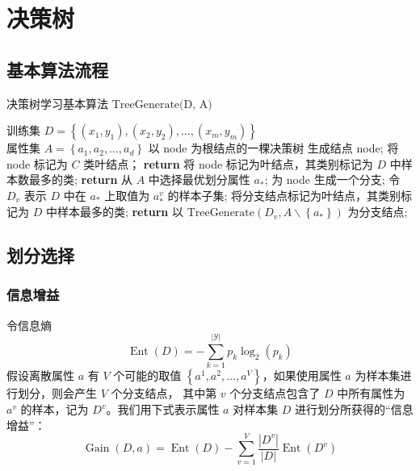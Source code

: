 \section{决策树}
\subsection{基本算法流程}
\begin{algorithm}[H]
    \renewcommand{\algorithmicrequire}{\textbf{Input:}}
	\renewcommand{\algorithmicensure}{\textbf{Output:}}
    \caption{决策树学习基本算法 $\text{TreeGenerate(D, A)}$}
    \begin{algorithmic}[1]
        \REQUIRE 训练集 $D = \left\{(x_1, y_1), (x_2, y_2), \dots, (x_m, y_m)\right\}$ \\ \qquad 属性集 $A = \left\{a_1, a_2, \dots, a_d\right\}$
        \ENSURE 以 node 为根结点的一棵决策树
        \STATE 生成结点 node;
        \STATE 将 node 标记为 $C$ 类叶结点；
        \STATE \textbf{return}
        \ENDIF
        \STATE 将 node 标记为叶结点，其类别标记为 $D$ 中样本数最多的类;
        \STATE \textbf{return}
        \ENDIF
        \STATE 从 $A$ 中选择最优划分属性 $a_*$;
        \STATE 为 node 生成一个分支;
        \STATE 令 $D_v$ 表示 $D$ 中在 $a_*$ 上取值为 $a_*^v$ 的样本子集;
        \STATE 将分支结点标记为叶结点，其类别标记为 $D$ 中样本最多的类;
        \STATE \textbf{return}
        \ELSE
        \STATE 以 $\text{TreeGenerate}\left(D_v, A \backslash \left\{a_*\right\}\right)$ 为分支结点;
        \ENDIF
        \ENDFOR
    \end{algorithmic}
\end{algorithm}
\subsection{划分选择}
\subsubsection{信息增益}
令信息熵
\begin{equation}
    \operatorname{Ent}(D) = -\sum\limits_{k=1}^{|\mathcal{Y}|}p_k\log _2(p_k)
\end{equation}
假设离散属性 $a$ 有 $V$ 个可能的取值 $\left\{a^1, a^2, \dots, a^V\right\}$，如果使用属性 $a$ 为样本集进行划分，则会产生 $V$ 个分支结点，
其中第 $v$ 个分支结点包含了 $D$ 中所有属性为 $a^v$ 的样本，记为 $D^v$。我们用下式表示属性 $a$ 对样本集 $D$ 进行划分所获得的“信息增益”：
\begin{equation}
    \operatorname{Gain}(D, a) = \operatorname{Ent}(D) - \sum\limits_{v = 1}^V
    {\dfrac{|D^v|}{|D|}\operatorname{Ent}(D^v)}
\end{equation}

